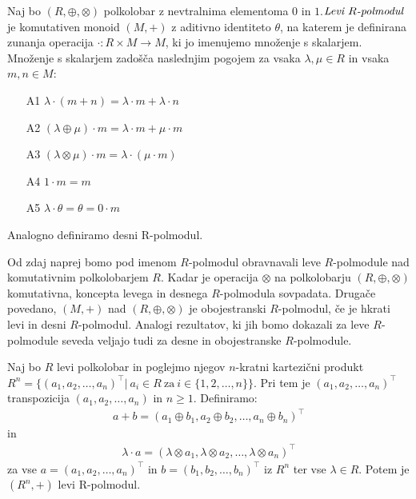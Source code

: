 \documentclass[mat1]{fmfdelo}
\newcommand{\pojem}[1]{\ensuremath{\emph{#1}}}
\newcommand{\map}[3]{\ensuremath{{#1}:{#2}\rightarrow{#3}}}
\begin{document}
\begin{definicija}\label{def:polmodul}
	Naj bo $(R, \oplus, \otimes)$ polkolobar z nevtralnima elementoma $0$ in $1$.\newline\pojem{Levi $R$-polmodul} je komutativen monoid $(M, +)$ z aditivno identiteto $\theta$, na katerem je definirana zunanja operacija \map{\cdot}{R\times M}{M}, ki jo imenujemo množenje s skalarjem. Množenje s skalarjem zadošča naslednjim pogojem za vsaka $\lambda,\mu\in R$ in vsaka $m, n\in M$:
	\begin{enumerate}
		\item[A1] $\lambda\cdot(m + n) = \lambda\cdot m + \lambda\cdot n$
		\item[A2] $(\lambda \oplus \mu)\cdot m = \lambda\cdot m + \mu\cdot m$
		\item[A3]  $(\lambda\otimes\mu) \cdot m = \lambda \cdot (\mu \cdot m)$
		\item[A4] $1\cdot m = m$
		\item[A5] $\lambda\cdot\theta = \theta = 0\cdot m$
	\end{enumerate}

Analogno definiramo desni R-polmodul.
\end{definicija}

	Od zdaj naprej bomo pod imenom $R$-polmodul obravnavali leve $R$-polmodule nad komutativnim polkolobarjem $R$. Kadar je operacija $\otimes$ na polkolobarju $(R,\oplus, \otimes)$ komutativna, koncepta levega in desnega $R$-polmodula sovpadata. Drugače povedano, $(M, +)$ nad $(R, \oplus, \otimes)$ je obojestranski $R$-polmodul, če je hkrati levi in desni $R$-polmodul. Analogi rezultatov, ki jih bomo dokazali za leve $R$-polmodule seveda veljajo  tudi za desne in obojestranske $R$-polmodule.

\begin{zgled}
	\label{zgled:Rnpolmodul}
	Naj bo $R$ levi polkolobar in poglejmo njegov $n$-kratni kartezični produkt $R^n = \{(a_1, a_2, \ldots, a_n)^{\top} |~ a_i \in R~\text{za}~i\in \{1, 2, \ldots, n\}\}$. Pri tem je $(a_1, a_2, \ldots, a_n)^{\top}$ transpozicija $(a_1, a_2, \ldots, a_n)$ in $n\geq 1$. Definiramo:
	\begin{align*}
		a + b = (a_1 \oplus b_1, a_2 \oplus b_2, \ldots, a_n \oplus b_n)^{\top}
	\end{align*}
	in
	\begin{align*}
		\lambda\cdot a = (\lambda\otimes a_1,\lambda\otimes a_2, \ldots,\lambda\otimes a_n)^{\top}
	\end{align*}
	za vse $a = (a_1, a_2, \ldots, a_n)^{\top}$ in $b = (b_1, b_2, \ldots, b_n)^{\top}$ iz $R^n$ ter vse $\lambda \in R$. Potem je $(R^n, +)$ levi R-polmodul.
\end{zgled}
\end{document}
